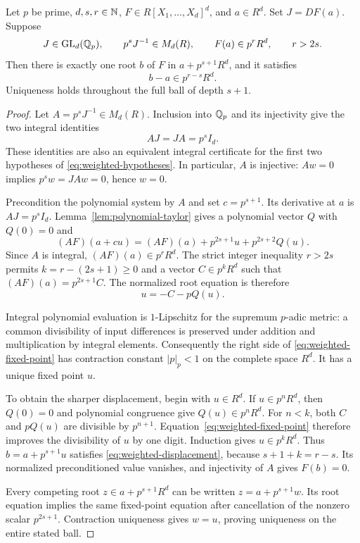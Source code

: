 \begin{theorem}\label{thm:weighted-lifting}
Let $p$ be prime, $d,s,r\in\mathbb N$, $F\in R[X_1,\ldots,X_d]^d$, and
$a\in R^d$. Set $J=DF(a)$. Suppose
\begin{equation}\label{eq:weighted-hypotheses}
 J\in\operatorname{GL}_d(\mathbb Q_p),\qquad
 p^sJ^{-1}\in M_d(R),\qquad F(a)\in p^rR^d,\qquad r>2s.
\end{equation}
Then there is exactly one root $b$ of $F$ in $a+p^{s+1}R^d$, and it
satisfies
\begin{equation}\label{eq:weighted-displacement}
 b-a\in p^{r-s}R^d.
\end{equation}
Uniqueness holds throughout the full ball of depth $s+1$.
\end{theorem}

\begin{proof}
Let $A=p^sJ^{-1}\in M_d(R)$. Inclusion into $\mathbb Q_p$ and its injectivity
give the two integral identities
\[
 AJ=JA=p^sI_d.
\]
These identities are also an equivalent integral certificate for the
first two hypotheses of \eqref{eq:weighted-hypotheses}. In particular,
$A$ is injective: $Aw=0$ implies $p^sw=JAw=0$, hence $w=0$.

Precondition the polynomial system by $A$ and set $c=p^{s+1}$.
Its derivative at $a$ is $AJ=p^sI_d$. Lemma~\ref{lem:polynomial-taylor}
gives a polynomial vector $Q$ with $Q(0)=0$ and
\[
 (AF)(a+cu)=(AF)(a)+p^{2s+1}u+p^{2s+2}Q(u).
\]
Since $A$ is integral, $(AF)(a)\in p^rR^d$. The strict integer inequality
$r>2s$ permits $k=r-(2s+1)\ge0$ and a vector $C\in p^kR^d$ such that
$(AF)(a)=p^{2s+1}C$. The normalized root equation is therefore
\begin{equation}\label{eq:weighted-fixed-point}
 u=-C-pQ(u).
\end{equation}

Integral polynomial evaluation is $1$-Lipschitz for the supremum
$p$-adic metric: a common divisibility of input differences is preserved
under addition and multiplication by integral elements. Consequently the
right side of \eqref{eq:weighted-fixed-point} has contraction constant
$|p|_p<1$ on the complete space $R^d$. It has a unique fixed point $u$.

To obtain the sharper displacement, begin with $u\in R^d$. If
$u\in p^nR^d$, then $Q(0)=0$ and polynomial congruence give
$Q(u)\in p^nR^d$. For $n<k$, both $C$ and $pQ(u)$ are divisible by
$p^{n+1}$. Equation~\eqref{eq:weighted-fixed-point} therefore improves
the divisibility of $u$ by one digit. Induction gives $u\in p^kR^d$.
Thus $b=a+p^{s+1}u$ satisfies \eqref{eq:weighted-displacement}, because
$s+1+k=r-s$. Its normalized preconditioned value vanishes, and injectivity
of $A$ gives $F(b)=0$.

Every competing root $z\in a+p^{s+1}R^d$ can be written
$z=a+p^{s+1}w$. Its root equation implies the same fixed-point
equation after cancellation of the nonzero scalar $p^{2s+1}$.
Contraction uniqueness gives $w=u$, proving uniqueness on the entire
stated ball.
\end{proof}

